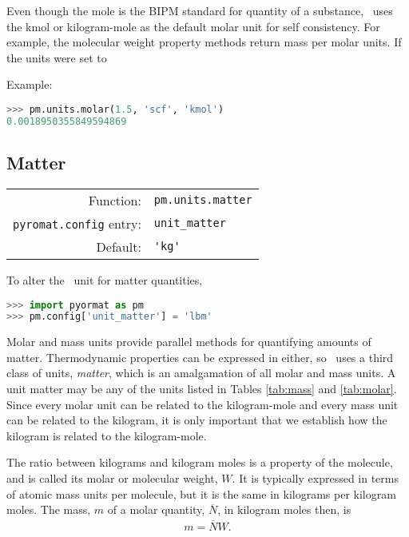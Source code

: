 Even though the mole is the BIPM standard for quantity of a substance, \PM\ uses the kmol or kilogram-mole as the default molar unit for self consistency.  For example, the molecular weight property methods return mass per molar units.  If the units were set to 


Example:
\begin{lstlisting}[language=Python]
>>> pm.units.molar(1.5, 'scf', 'kmol')
0.0018950355849594869
\end{lstlisting}


%
%

\subsection{Matter}\label{sec:units:matter}

\begin{tabular}{rl}
\hline
Function: & \verb|pm.units.matter|\\
\verb|pyromat.config| entry: & \verb|unit_matter|\\
Default: & \verb|'kg'|\\
\hline
\end{tabular}
\vspace{1em}

To alter the \PM\ unit for matter quantities,
\begin{lstlisting}[language=Python]
>>> import pyormat as pm
>>> pm.config['unit_matter'] = 'lbm'
\end{lstlisting}

Molar and mass units provide parallel methods for quantifying amounts of matter.  Thermodynamic properties can be expressed in either, so \PM\ uses a third class of units, \emph{matter}, which is an amalgamation of all molar and mass units.  A unit matter may be any of the units listed in Tables \ref{tab:mass} and \ref{tab:molar}.  Since every molar unit can be related to the kilogram-mole and every mass unit can be related to the kilogram, it is only important that we establish how the kilogram is related to the kilogram-mole.

The ratio between kilograms and kilogram moles is a property of the molecule, and is called its molar or molecular weight, $W$.  It is typically expressed in terms of atomic mass units per molecule, but it is the same in kilograms per kilogram moles.  The mass, $m$ of a molar quantity, $\overline{N}$, in kilogram moles then, is
\begin{align}
m = \overline{N} W.
\end{align}

